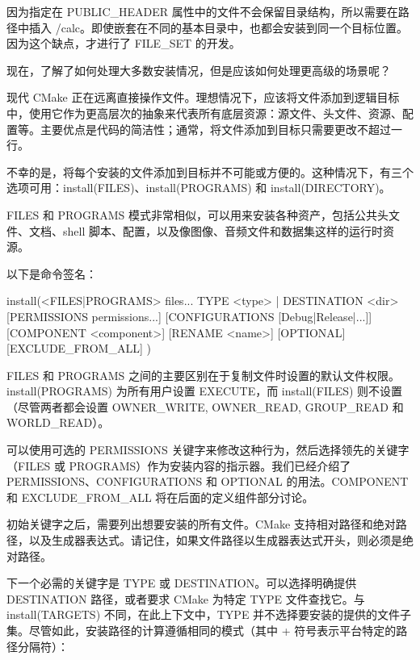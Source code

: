 
因为指定在 PUBLIC\_HEADER 属性中的文件不会保留目录结构，所以需要在路径中插入 /calc。即使嵌套在不同的基本目录中，也都会安装到同一个目标位置。因为这个缺点，才进行了 FILE\_SET 的开发。

现在，了解了如何处理大多数安装情况，但是应该如何处理更高级的场景呢？


现代 CMake 正在远离直接操作文件。理想情况下，应该将文件添加到逻辑目标中，使用它作为更高层次的抽象来代表所有底层资源：源文件、头文件、资源、配置等。主要优点是代码的简洁性；通常，将文件添加到目标只需要更改不超过一行。

不幸的是，将每个安装的文件添加到目标并不可能或方便的。这种情况下，有三个选项可用：install(FILES)、install(PROGRAMS) 和 install(DIRECTORY)。


FILES 和 PROGRAMS 模式非常相似，可以用来安装各种资产，包括公共头文件、文档、shell 脚本、配置，以及像图像、音频文件和数据集这样的运行时资源。

以下是命令签名：

\begin{shell}
install(<FILES|PROGRAMS> files...
        TYPE <type> | DESTINATION <dir>
        [PERMISSIONS permissions...]
        [CONFIGURATIONS [Debug|Release|...]]
        [COMPONENT <component>]
        [RENAME <name>] [OPTIONAL] [EXCLUDE_FROM_ALL]
)
\end{shell}

FILES 和 PROGRAMS 之间的主要区别在于复制文件时设置的默认文件权限。install(PROGRAMS) 为所有用户设置 EXECUTE，而 install(FILES) 则不设置（尽管两者都会设置 OWNER\_WRITE, OWNER\_READ, GROUP\_READ 和 WORLD\_READ）。

可以使用可选的 PERMISSIONS 关键字来修改这种行为，然后选择领先的关键字（FILES 或 PROGRAMS）作为安装内容的指示器。我们已经介绍了 PERMISSIONS、CONFIGURATIONS 和 OPTIONAL 的用法。COMPONENT 和 EXCLUDE\_FROM\_ALL 将在后面的定义组件部分讨论。

初始关键字之后，需要列出想要安装的所有文件。CMake 支持相对路径和绝对路径，以及生成器表达式。请记住，如果文件路径以生成器表达式开头，则必须是绝对路径。

下一个必需的关键字是 TYPE 或 DESTINATION。可以选择明确提供 DESTINATION 路径，或者要求 CMake 为特定 TYPE 文件查找它。与 install(TARGETS) 不同，在此上下文中，TYPE 并不选择要安装的提供的文件子集。尽管如此，安装路径的计算遵循相同的模式（其中 + 符号表示平台特定的路径分隔符）：

